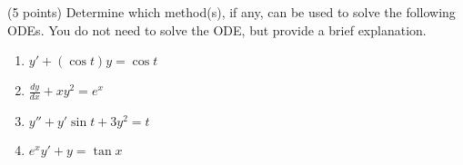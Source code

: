 \documentclass[11pt,letterpaper,boxed]{hmcpset}
\begin{document}
\pagebreak


\begin{problem}[8]
(5 points) Determine which method(s), if any, can be used to solve the following ODEs. You
do not need to solve the ODE, but provide a brief explanation.
\begin{enumerate}
\item $y' + (\cos t)y = \cos t$
\item $\frac{dy}{dx} +xy^2 =e^x$
\item $y'' + y' \sin t + 3y^2 = t$
\item $e^xy' + y = \tan x$
\end{enumerate}
\end{problem}

\end{document}
